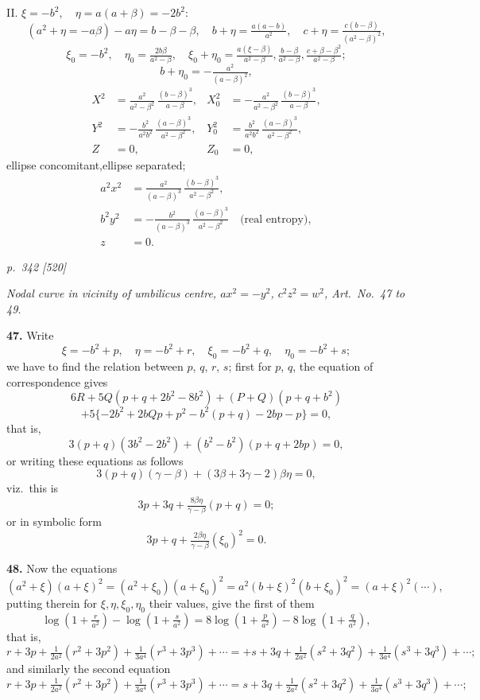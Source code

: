 \documentclass[11pt,a4paper]{article}
\theoremstyle{plain}
\theoremstyle{definition}
\begin{document}
II. $\xi = -b^2, \quad \eta = a(a + \beta) = -2b^2$:
\[
(a^2 + \eta = -a\beta) - a\eta = b - \beta - \beta,\quad b + \eta = \tfrac{a(a - b)}{a^2}, \quad c + \eta = \tfrac{c(b - \beta)}{(a^2 - \beta)^2},
\]
\[
\xi_0 = -b^2,\quad \eta_0 = \tfrac{2b\beta}{a^2 - \beta}, \quad \xi_0 + \eta_0 = \tfrac{a(\xi - \beta)}{a^2 - \beta}, \tfrac{b - \beta}{a^2 - \beta}, \tfrac{c + \beta - \beta^2}{a^2 - \beta};
\]
\[
b + \eta_0 = -\tfrac{a^2}{(a - \beta)^2},
\]
\begin{align*}
X^2 &= \tfrac{a^2}{a^2 - \beta^2}\,\tfrac{(b - \beta)^3}{a - \beta}, &
X_0^2 &= -\tfrac{a^2}{a^2 - \beta^2}\,\tfrac{(b - \beta)^3}{a - \beta},\\
Y^2 &= -\tfrac{b^2}{a^2 b^2}\,\tfrac{(a - \beta)^3}{a^2 - \beta^2}, &
Y_0^2 &= \tfrac{b^2}{a^2 b^2}\,\tfrac{(a - \beta)^3}{a^2 - \beta^2},\\
Z &= 0, & Z_0 &= 0,
\end{align*}
ellipse concomitant,\hfill ellipse separated;
\begin{align*}
a^2 x^2 &= \tfrac{a^2}{(a - \beta)^3}\,\tfrac{(b - \beta)^3}{a^2 - \beta^2},\\
b^2 y^2 &= -\tfrac{b^2}{(a - \beta)^3}\,\tfrac{(a - \beta)^3}{a^2 - \beta^2}\quad\text{(real entropy)},\\
z &= 0.
\end{align*}

\clearpage

\bigskip
\textit{p.~342 [520]}
\smallskip


\textit{Nodal curve in vicinity of umbilicus centre, $a x^2 = -y^2$, $c^2 z^2 = w^2$, Art.\ No.\ 47 to 49.}

\textbf{47.} Write
\[
\xi = -b^2 + p,\quad \eta = -b^2 + r,\quad \xi_0 = -b^2 + q, \quad \eta_0 = -b^2 + s;
\]
we have to find the relation between $p$, $q$, $r$, $s$; first for $p$, $q$, the equation of correspondence gives
\[
6R + 5Q(p + q + 2b^2 - 8b^2) + (P + Q)(p + q + b^2)
\]
\[
+ 5\{-2b^2 + 2bQp + p^2 - b^2(p + q) - 2bp - p\} = 0,
\]
that is,
\[
3(p + q)(3b^2 - 2b^2) + (b^2 - b^2)(p + q + 2bp) = 0,
\]
or writing these equations as follows
\[
3(p + q)(\gamma - \beta) + (3 \beta + 3\gamma - 2)\beta\eta = 0,
\]
viz.\ this is
\[
3p + 3q + \tfrac{8\beta\eta}{\gamma - \beta}(p + q) = 0;
\]
or in symbolic form
\[
3p + q + \tfrac{2\beta\eta}{\gamma - \beta}(\xi_0)^2 = 0.
\]

\textbf{48.} Now the equations
\[
(a^2 + \xi)(a + \xi)^2 = (a^2 + \xi_0)(a + \xi_0)^2 = a^2(b + \xi)^2(b + \xi_0)^2 = (a + \xi)^2(\cdots),
\]
putting therein for $\xi, \eta, \xi_0, \eta_0$ their values, give the first of them
\[
\log\!\left(1 + \tfrac{r}{a^2}\right) - \log\!\left(1 + \tfrac{s}{a^2}\right) = 8\log\!\left(1 + \tfrac{p}{a^2}\right) - 8\log\!\left(1 + \tfrac{q}{a^2}\right),
\]
that is,
\[
r + 3p + \tfrac{1}{2a^2}(r^2 + 3p^2) + \tfrac{1}{3a^4}(r^3 + 3p^3) + \cdots = +s + 3q + \tfrac{1}{2a^2}(s^2 + 3q^2) + \tfrac{1}{3a^4}(s^3 + 3q^3) + \cdots ;
\]
and similarly the second equation
\[
r + 3p + \tfrac{1}{2a^2}(r^2 + 3p^2) + \tfrac{1}{3a^4}(r^3 + 3p^3) + \cdots = s + 3q + \tfrac{1}{2a^2}(s^2 + 3q^2) + \tfrac{1}{3a^4}(s^3 + 3q^3) + \cdots;
\]
\end{document}
